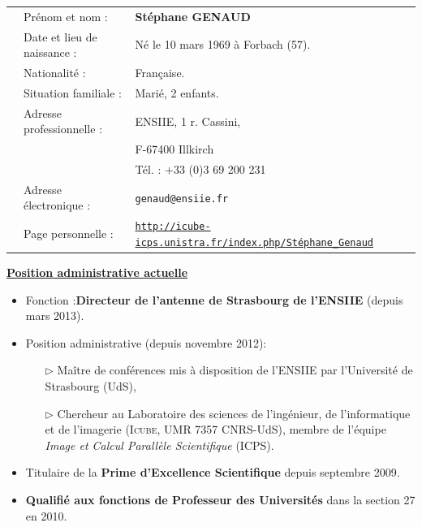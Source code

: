 \documentclass[11pt]{article}
\begin{document}
\medskip

\noindent
\begin{tabular}{llp{\linewidth}}

\hspace{1cm}	& Prénom et nom :			&\textbf{Stéphane GENAUD}\\
		 	& Date et lieu de naissance :	& Né le 10 mars 1969 à Forbach (57).\\
			& Nationalité :			& Française. \\
			& Situation familiale :		& Marié, 2 enfants. \\
			& Adresse professionnelle :	& ENSIIE, 1 r. Cassini,\\
			&      				& F-67400 Illkirch\\
			&				& Tél. : +33 (0)3 69 200 231\\ 
			& Adresse électronique :	& \texttt{genaud@ensiie.fr}\\
			& Page personnelle :		& \texttt{{\url{http://icube-icps.unistra.fr/index.php/Stéphane_Genaud}}}\\[5mm]

\end{tabular}

\vspace{8mm}
\textbf{\underline{Position administrative actuelle}}
\vspace{5mm}

\begin{itemize}
\item Fonction :\textbf{Directeur de l'antenne de Strasbourg de l'ENSIIE} (depuis mars 2013).\\[1mm]
       
\item Position administrative  (depuis novembre 2012): 
   \begin{itemize}
	\item[$\rhd$] Maître  de conférences mis  à disposition de  l'ENSIIE par
          l'Université de Strasbourg (UdS),
	\item[$\rhd$] Chercheur  au Laboratoire des sciences  de l'ingénieur, de
          l'informatique et de l'imagerie (\textsc{Icube},  UMR 7357 CNRS-UdS), membre de
          l'équipe \textit{Image et Calcul Parallèle Scientifique} (ICPS).\\
   \end{itemize}

\item Titulaire de la \textbf{Prime d'Excellence Scientifique} depuis septembre 2009.\\

\item \textbf{Qualifié aux fonctions de Professeur des Universités} dans la 
              section 27 en 2010.\\
	\\[2mm]
\end{itemize}
\end{document}
